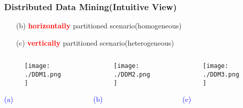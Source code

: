 \documentclass{beamer} %
\newcommand{\blue}[1]{\textcolor{blue}{#1}}
\newcommand{\red}[1]{\textcolor{red}{#1}}
\begin{document}
\begin{frame}
\frametitle{Distributed Data Mining(Intuitive View)}

\begin{itemize} \itemsep2pt \parskip0pt 
    \item[(b)] \red{\bf horizontally} partitioned scenario(homogeneous)
    \item[(c)] \red{\bf vertically} partitioned scenario(heterogeneous)
\end{itemize}


\begin{columns}
\begin{column}{3cm}
\begin{figure}[H]
\centering
\texttt{[image: ./DDM1.png]}
\end{figure}
\vspace{2mm}
\centerline{\blue{(a)}}
\end{column}


\begin{column}{5cm}
\begin{figure}[H]
\centering
\texttt{[image: ./DDM2.png]}
\end{figure}
\centerline{\blue{(b)}}
\end{column}


\begin{column}{4cm}
\begin{figure}[H]
\centering
\texttt{[image: ./DDM3.png]}
\end{figure}
\vspace{4mm}
\centerline{\blue{(c)}}
\end{column}

\end{columns}


\end{frame}
\end{document}
